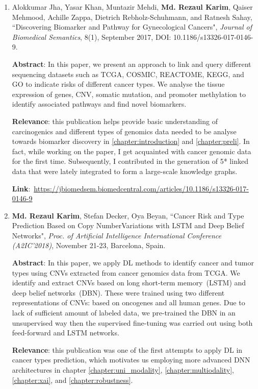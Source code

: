 \begin{enumerate}
	\item {Alokkumar Jha, Yasar Khan, Muntazir Mehdi, \textbf{Md. Rezaul Karim}, Qaiser Mehmood, Achille Zappa, Dietrich Rebholz-Schuhmann, and Ratnesh Sahay, ``Discovering Biomarker and Pathway for Gynecological Cancers", \emph{Journal of Biomedical Semantics}, 8(1), September 2017, DOI: 10.1186/s13326-017-0146-9.} 
	
	\textbf{Abstract}: In this paper, we present an approach to link and query different sequencing datasets such as TCGA, COSMIC, REACTOME, KEGG, and GO to indicate risks of different cancer types. We analyse the tissue expression of genes, CNV, somatic mutation, and promoter methylation to identify associated pathways and find novel biomarkers. 
	
	\textbf{Relevance}: this publication helps provide basic understanding of carcinogenics and different types of genomics data needed to be analyse towards biomarker discovery in \cref{chapter:introduction} and \cref{chapter:preli}. In fact, while working on the paper, I get acquainted with cancer genomic data for the first time. Subsequently, I contributed in the generation of 5* linked data that were lately integrated to form a large-scale knowledge graphs. 
	
	\textbf{Link}:~\url{https://jbiomedsem.biomedcentral.com/articles/10.1186/s13326-017-0146-9}
	
	\item \textbf{Md. Rezaul Karim}, Stefan Decker, Oya Beyan, ``Cancer Risk and Type Prediction Based on Copy NumberVariations with LSTM and Deep Belief Networks", \emph{Proc. of Artificial Intelligence International Conference (A2IC'2018)}, November 21-23, Barcelona, Spain. 
	
	\textbf{Abstract}: In this paper, we apply DL methods to identify cancer and tumor types using CNVs extracted from cancer genomics data from TCGA. We identify and extract CNVs based on long short-term memory~(LSTM) and deep belief networks~(DBN). These were trained using two different representations of CNVs: based on oncogenes and all human genes. Due to lack of sufficient amount of labeled data, we pre-trained the DBN in an unsupervised way then the supervised fine-tuning was carried out using both feed-forward and LSTM networks. 
	
	\textbf{Relevance}: this publication was one of the first attempts to apply DL in cancer types prediction, which motivates us employing more advanced DNN architectures in chapter \ref{chapter:uni_modality}, \ref{chapter:multiodality}, \ref{chapter:xai}, and \ref{chapter:robustness}.
	

\end{enumerate}

